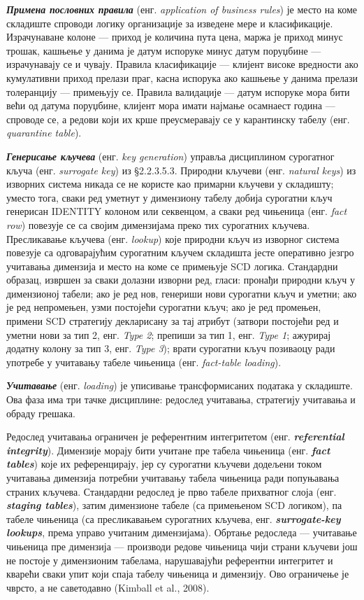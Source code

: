 \textbf{\textit{Примена пословних правила}} (енг. \textit{application of business rules}) је место на коме складиште спроводи логику организације за изведене мере и класификације. Израчунаване колоне — приход је количина пута цена, маржа је приход минус трошак, кашњење у данима је датум испоруке минус датум поруџбине — израчунавају се и чувају. Правила класификације — клијент високе вредности ако кумулативни приход прелази праг, касна испорука ако кашњење у данима прелази толеранцију — примењују се. Правила валидације — датум испоруке мора бити већи од датума поруџбине, клијент мора имати најмање осамнаест година — спроводе се, а редови који их крше преусмеравају се у карантинску табелу (енг. \textit{quarantine table}).

\textbf{\textit{Генерисање кључева}} (енг. \textit{key generation}) управља дисциплином сурогатног кључа (енг. \textit{surrogate key}) из §2.2.3.5.3. Природни кључеви (енг. \textit{natural keys}) из изворних система никада се не користе као примарни кључеви у складишту; уместо тога, сваки ред уметнут у димензиону табелу добија сурогатни кључ генерисан IDENTITY колоном или секвенцом, а сваки ред чињеница (енг. \textit{fact row}) повезује се са својим димензијама преко тих сурогатних кључева. Пресликавање кључева (енг. \textit{lookup}) које природни кључ из изворног система повезује са одговарајућим сурогатним кључем складишта јесте оперативно језгро учитавања димензија и место на коме се примењује SCD логика. Стандардни образац, извршен за сваки долазни изворни ред, гласи: пронађи природни кључ у димензионој табели; ако је ред нов, генериши нови сурогатни кључ и уметни; ако је ред непромењен, узми постојећи сурогатни кључ; ако је ред промењен, примени SCD стратегију декларисану за тај атрибут (затвори постојећи ред и уметни нови за тип 2, енг. \textit{Type 2}; препиши за тип 1, енг. \textit{Type 1}; ажурирај додатну колону за тип 3, енг. \textit{Type 3}); врати сурогатни кључ позиваоцу ради употребе у учитавању табеле чињеница (енг. \textit{fact-table loading}).

\textbf{\textit{Учитавање}} (енг. \textit{loading}) је уписивање трансформисаних података у складиште. Ова фаза има три тачке дисциплине: редослед учитавања, стратегију учитавања и обраду грешака.

Редослед учитавања ограничен је референтним интегритетом (енг. \textbf{\textit{referential integrity}}). Димензије морају бити учитане пре табела чињеница (енг. \textbf{\textit{fact tables}}) које их референцирају, јер су сурогатни кључеви додељени током учитавања димензија потребни учитавању табела чињеница ради попуњавања страних кључева. Стандардни редослед је прво табеле прихватног слоја (енг. \textbf{\textit{staging tables}}), затим димензионе табеле (са примењеном SCD логиком), па табеле чињеница (са пресликавањем сурогатних кључева, енг. \textbf{\textit{surrogate-key lookups}}, према управо учитаним димензијама). Обртање редоследа — учитавање чињеница пре димензија — производи редове чињеница чији страни кључеви још не постоје у димензионим табелама, нарушавајући референтни интегритет и кварећи сваки упит који спаја табелу чињеница и димензију. Ово ограничење је чврсто, а не саветодавно (Kimball et al., 2008).

